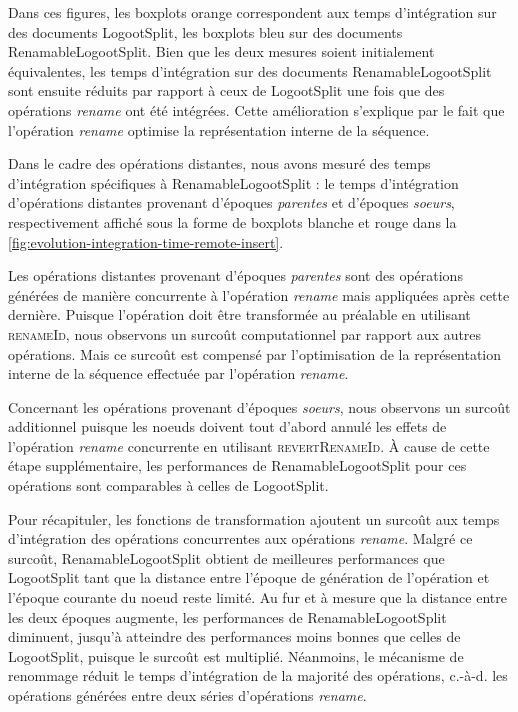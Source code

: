 \documentclass[12pt]{thesul}
\newcommand{\ie}{c.-à-d. }
\begin{document}
Dans ces figures, les boxplots orange correspondent aux temps d'intégration sur des documents LogootSplit, les boxplots bleu sur des documents RenamableLogootSplit.
Bien que les deux mesures soient initialement équivalentes, les temps d'intégration sur des documents RenamableLogootSplit sont ensuite réduits par rapport à ceux de LogootSplit une fois que des opérations \emph{rename} ont été intégrées.
Cette amélioration s'explique par le fait que l'opération \emph{rename} optimise la représentation interne de la séquence.

Dans le cadre des opérations distantes, nous avons mesuré des temps d'intégration spécifiques à RenamableLogootSplit : le temps d'intégration d'opérations distantes provenant d'époques \emph{parentes} et d'époques \emph{soeurs}, respectivement affiché sous la forme de boxplots blanche et rouge dans la \autoref{fig:evolution-integration-time-remote-insert}.

Les opérations distantes provenant d'époques \emph{parentes} sont des opérations générées de manière concurrente à l'opération \emph{rename} mais appliquées après cette dernière.
Puisque l'opération doit être transformée au préalable en utilisant \textsc{renameId}, nous observons un surcoût computationnel par rapport aux autres opérations.
Mais ce surcoût est compensé par l'optimisation de la représentation interne de la séquence effectuée par l'opération \emph{rename}.

Concernant les opérations provenant d'époques \emph{soeurs}, nous observons un surcoût additionnel puisque les noeuds doivent tout d'abord annulé les effets de l'opération \emph{rename} concurrente en utilisant \textsc{revertRenameId}.
À cause de cette étape supplémentaire, les performances de RenamableLogootSplit pour ces opérations sont comparables à celles de LogootSplit.

Pour récapituler, les fonctions de transformation ajoutent un surcoût aux temps d'intégration des opérations concurrentes aux opérations \emph{rename}.
Malgré ce surcoût, RenamableLogootSplit obtient de meilleures performances que LogootSplit tant que la distance entre l'époque de génération de l'opération et l'époque courante du noeud reste limité.
Au fur et à mesure que la distance entre les deux époques augmente, les performances de RenamableLogootSplit diminuent, jusqu'à atteindre des performances moins bonnes que celles de LogootSplit, puisque le surcoût est multiplié.
Néanmoins, le mécanisme de renommage réduit le temps d'intégration de la majorité des opérations, \ie les opérations générées entre deux séries d'opérations \emph{rename}.
\end{document}
